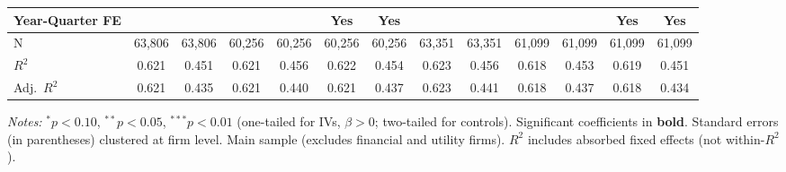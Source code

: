 \begin{landscape}
\begin{table}[H]
\begin{tabular}{lcccccccccccc}
Year-Quarter FE &  &  &  &  & Yes & Yes &  &  &  &  & Yes & Yes \\
\midrule
N & 63,806 & 63,806 & 60,256 & 60,256 & 60,256 & 60,256 & 63,351 & 63,351 & 61,099 & 61,099 & 61,099 & 61,099 \\
$R^2$ & 0.621 & 0.451 & 0.621 & 0.456 & 0.622 & 0.454 & 0.623 & 0.456 & 0.618 & 0.453 & 0.619 & 0.451 \\
Adj.~$R^2$ & 0.621 & 0.435 & 0.621 & 0.440 & 0.621 & 0.437 & 0.623 & 0.441 & 0.618 & 0.437 & 0.618 & 0.434 \\
\bottomrule
\end{tabular}
\begin{minipage}{\linewidth}
\vspace{2pt}\scriptsize
\textit{Notes:} $^{*}p<0.10$, $^{**}p<0.05$, $^{***}p<0.01$ (one-tailed for IVs, $\beta > 0$; two-tailed for controls).
 Significant coefficients in \textbf{bold}.
 Standard errors (in parentheses) clustered at firm level.
 Main sample (excludes financial and utility firms).
 $R^2$ includes absorbed fixed effects (not within-$R^2$).
\end{minipage}
\end{table}
\end{landscape}